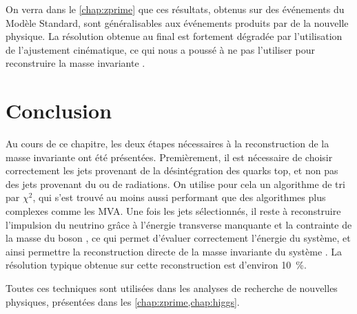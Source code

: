 On verra dans le \cref{chap:zprime} que ces résultats, obtenus sur des événements \ttbar du Modèle Standard, sont généralisables aux événements \ttbar produits par de la nouvelle physique. La résolution obtenue au final est fortement dégradée par l'utilisation de l'ajustement cinématique, ce qui nous a poussé à ne pas l'utiliser pour reconstruire la masse invariante \ttbar.


\section{Conclusion}

Au cours de ce chapitre, les deux étapes nécessaires à la reconstruction de la masse invariante \ttbar ont été présentées. Premièrement, il est nécessaire de choisir correctement les jets provenant de la désintégration des quarks top, et non pas des jets provenant du \pu ou de radiations. On utilise pour cela un algorithme de tri par $\chi^2$, qui s'est trouvé au moins aussi performant que des algorithmes plus complexes comme les MVA. Une fois les jets sélectionnés, il reste à reconstruire l'impulsion du neutrino grâce à l'énergie transverse manquante et la contrainte de la masse du boson \PW, ce qui permet d'évaluer correctement l'énergie du système, et ainsi permettre la reconstruction directe de la masse invariante du système \ttbar. La résolution typique obtenue sur cette reconstruction est d'environ \SI{10}{\percent}.

\bigskip

Toutes ces techniques sont utilisées dans les analyses de recherche de nouvelles physiques, présentées dans les \cref{chap:zprime,chap:higgs}.